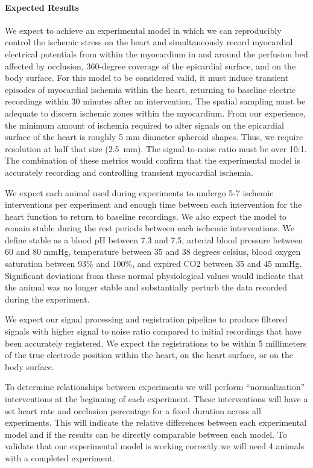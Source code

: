 \paragraph{Expected Results} We expect to achieve an experimental model in which we can reproducibly control the ischemic stress on the heart and simultaneously record myocardial electrical potentials from within the myocardium in and around the perfusion bed affected by occlusion, 360-degree coverage of the epicardial surface, and on the body surface.  For this model to be considered valid, it must induce transient episodes of myocardial ischemia within the heart, returning to baseline electric recordings within 30 minutes after an intervention. The spatial sampling must be adequate to discern ischemic zones within the myocardium. From our experience, the minimum amount of ischemia required to alter signals on the epicardial surface of the heart is roughly 5 mm diameter spheroid shapes. Thus, we require resolution at half that size (2.5~mm).  The signal-to-noise ratio must be over 10:1. The combination of these metrics would confirm that the experimental model is accurately recording and controlling transient myocardial ischemia.

We expect each animal used during experiments to undergo 5-7 ischemic interventions per experiment and enough time between each intervention for the heart function to return to baseline recordings. We also expect the model to remain stable during the rest periods between each ischemic interventions. We define stable as a blood pH between 7.3 and 7.5, arterial blood pressure between 60 and 80 mmHg, temperature between 35 and 38 degrees celsius, blood oxygen saturation between 93\% and 100\%, and expired CO2 between 35 and 45 mmHg. Significant deviations from these normal physiological values would indicate that the animal was no longer stable and substantially perturb the data recorded during the experiment. 

We expect our signal processing and registration pipeline to produce filtered signals with higher signal to noise ratio compared to initial recordings that have been accurately registered. We expect the registrations to be within 5 millimeters of the true electrode position within the heart, on the heart surface, or on the body surface. 

To determine relationships between experiments we will perform ``normalization'' interventions at the beginning of each experiment. These interventions will have a set heart rate and occlusion percentage for a fixed duration across all experiments. This will indicate the relative differences between each experimental model and if the results can be directly comparable between each model. To validate that our experimental model is working correctly we will need 4 animals with a completed experiment. 



